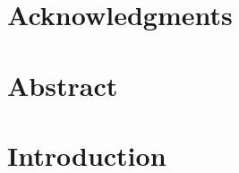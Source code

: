 \documentclass[11pt]{book}
\renewcommand{\baselinestretch}{1.2}
\begin{document}



\newpage
\thispagestyle{empty}
\renewcommand{\thesisdedication}{{\large Copyright \copyright~~Mallikarjun B R, 2016\\}{\large All Rights Reserved\\}}
\thesisdedicationpage



\newpage
\thispagestyle{empty}
\renewcommand{\thesisdedication}{\large To My Family}
\thesisdedicationpage

\mastersthesis
\renewcommand{\baselinestretch}{1.5}

\chapter*{Acknowledgments}
\label{ch:ack}


\chapter*{Abstract}
\label{ch:abstract}


\tableofcontents
\listoffigures
\listoftables

\chapter{Introduction}
\label{ch:intro}



% 
% 
% 
% 
% 
% 
% 
% 
% 
% 
% 
% 



 
\end{document}

